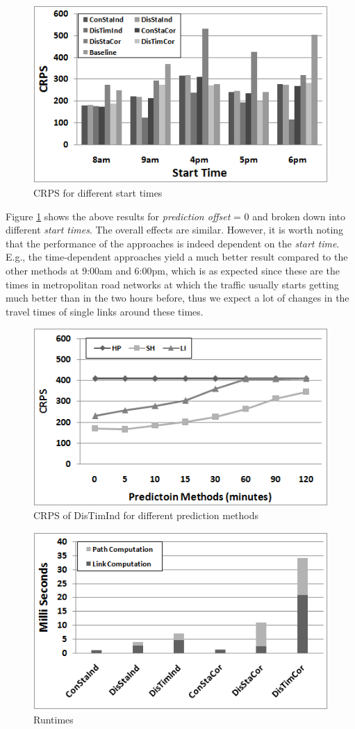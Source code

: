 \begin{figure}[h]
	\centering
	\includegraphics[width = 0.7\columnwidth]{figures/path2_results.png}
	\caption{CRPS for different start times}\label{fig:path_comp2}
	\vspace{-0.3cm}
\end{figure}

Figure \ref{fig:path_comp2} shows the above results for \textit{prediction
offset} = 0 and broken down into different \textit{start times}. The overall
effects are similar. However, it is worth noting that the performance of the
approaches is indeed dependent on the \textit{start time}. E.g., the
time-dependent approaches yield a much better result compared to the other
methods at 9:00am and 6:00pm, which is as expected since these are the times in
metropolitan road networks at which the traffic usually starts getting much better than
in the two hours before, thus we expect a lot of changes in the travel times of
single links around these times.

\begin{figure}[h]
	\centering
	\includegraphics[width = 0.75\columnwidth]{figures/DTI_results.png}
	\caption{CRPS of DisTimInd for different prediction
	methods}\label{fig:dti_results}
\end{figure}

\begin{figure}
    \centering
    \includegraphics[width = 0.75\columnwidth]{figures/runTime_results.png}
    \caption{Runtimes}\label{fig:runtimes}
\end{figure}

